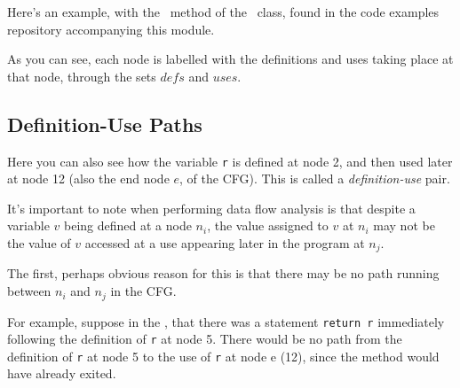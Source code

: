 Here's an example, with the \signmethod~method of the \signutilsclass~class,
found in the code examples repository accompanying this module.

As you can see, each node is labelled with the definitions and uses taking place
at that node, through the sets $\mathit{defs}$ and $\mathit{uses}$.


\subsection{Definition-Use Paths}


Here you can also see how the variable {\tt r} is defined at node 2, and then used
later at node 12 (also the end node $e$, of the CFG). This is called a {\it
definition-use} pair.



It's important to note when performing data flow analysis is that despite a
variable $v$ being defined at a node $n_i$, the value assigned to $v$ at $n_i$
may not be the value of $v$ accessed at a use appearing later in the program at
$n_j$.


The first, perhaps obvious reason for this is that there may be no path running
between $n_i$ and $n_j$ in the CFG. 

For example, suppose in the \signmethod,
that there was a statement {\tt return r} immediately following the definition
of {\tt r} at node 5. There would be no path from the definition of {\tt r} at
node 5 to the use of {\tt r} at node e (12), since the method would have already
exited.


